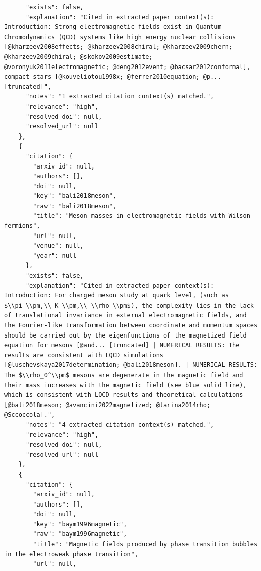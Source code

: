 \documentclass[11pt]{article}
\begin{document}
\begin{verbatim}
      "exists": false,
      "explanation": "Cited in extracted paper context(s): Introduction: Strong electromagnetic fields exist in Quantum Chromodynamics (QCD) systems like high energy nuclear collisions [@kharzeev2008effects; @kharzeev2008chiral; @kharzeev2009chern; @kharzeev2009chiral; @skokov2009estimate; @voronyuk2011electromagnetic; @deng2012event; @bacsar2012conformal], compact stars [@kouveliotou1998x; @ferrer2010equation; @p... [truncated]",
      "notes": "1 extracted citation context(s) matched.",
      "relevance": "high",
      "resolved_doi": null,
      "resolved_url": null
    },
    {
      "citation": {
        "arxiv_id": null,
        "authors": [],
        "doi": null,
        "key": "bali2018meson",
        "raw": "bali2018meson",
        "title": "Meson masses in electromagnetic fields with Wilson fermions",
        "url": null,
        "venue": null,
        "year": null
      },
      "exists": false,
      "explanation": "Cited in extracted paper context(s): Introduction: For charged meson study at quark level, (such as $\\pi_\\pm,\\ K_\\pm,\\ \\rho_\\pm$), the complexity lies in the lack of translational invariance in external electromagnetic fields, and the Fourier-like transformation between coordinate and momentum spaces should be carried out by the eigenfunctions of the magnetized field equation for mesons [@and... [truncated] | NUMERICAL RESULTS: The results are consistent with LQCD simulations [@luschevskaya2017determination; @bali2018meson]. | NUMERICAL RESULTS: The $\\rho_0^\\pm$ mesons are degenerate in the magnetic field and their mass increases with the magnetic field (see blue solid line), which is consistent with LQCD results and theoretical calculations [@bali2018meson; @avancini2022magnetized; @larina2014rho; @Sccoccola].",
      "notes": "4 extracted citation context(s) matched.",
      "relevance": "high",
      "resolved_doi": null,
      "resolved_url": null
    },
    {
      "citation": {
        "arxiv_id": null,
        "authors": [],
        "doi": null,
        "key": "baym1996magnetic",
        "raw": "baym1996magnetic",
        "title": "Magnetic fields produced by phase transition bubbles in the electroweak phase transition",
        "url": null,

\end{verbatim}
\end{document}
